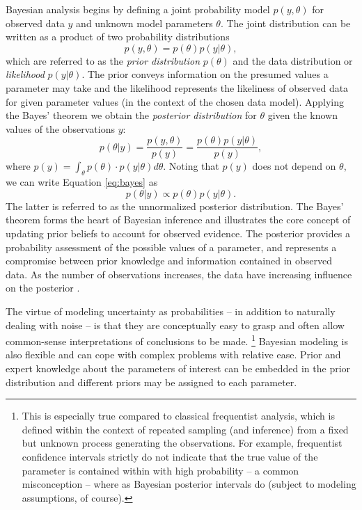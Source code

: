 Bayesian analysis begins by defining a joint probability model $p(y,\theta)$
for observed data $y$ and unknown model parameters $\theta$.
The joint distribution can be written as a product of two probability distributions
\begin{equation}
  p(y,\theta) = p(\theta) p(y|\theta),
\end{equation}
which are referred to as the \emph{prior distribution} $p(\theta)$ and the
data distribution or \emph{likelihood} $p(y|\theta)$. The prior conveys
information on the presumed values a parameter may take and the likelihood
represents the likeliness of observed data for given parameter values (in the
context of the chosen data model). Applying the Bayes' theorem we obtain the
\emph{posterior distribution} for $\theta$ given the known values of the
observations $y$:
\begin{equation}
  \label{eq:bayes}
  p(\theta|y) = \frac{p(y,\theta)}{p(y)} = \frac{p(\theta) p(y|\theta)}{p(y)},
\end{equation}
where $p(y) = \int_{\theta} p(\theta) \cdot p(y|\theta) d\theta$.
Noting that $p(y)$ does not depend on $\theta$, we can write Equation
\ref{eq:bayes} as
\begin{equation}
  p(\theta|y) \propto p(\theta) p(y|\theta).
\end{equation}
The latter is referred to as the unnormalized posterior distribution. The
Bayes' theorem forms the heart of Bayesian inference and illustrates the core
concept of updating prior beliefs to account for observed evidence. The
posterior provides a probability assessment of the possible values of
a parameter, and represents a compromise between prior knowledge and information
contained in observed data. As the number of observations increases, the
data have increasing influence on the posterior \citep{Gelman2013}.

The virtue of modeling uncertainty as probabilities -- in addition to
naturally dealing with noise -- is that they are conceptually easy to grasp
and often allow common-sense interpretations of conclusions to be made.
\footnote{This is especially true compared to classical frequentist analysis,
which is defined within the context of repeated sampling (and inference) from
a fixed but unknown process generating the observations. For
example, frequentist confidence intervals strictly do not indicate that the
true value of the parameter is contained within with high probability -- a
common misconception -- where as Bayesian posterior intervals do (subject to
modeling assumptions, of course).}
Bayesian modeling is also flexible and can cope with complex problems with
relative ease. Prior and expert knowledge about the parameters of interest can be
embedded in the prior distribution and different priors may be assigned to
each parameter.

